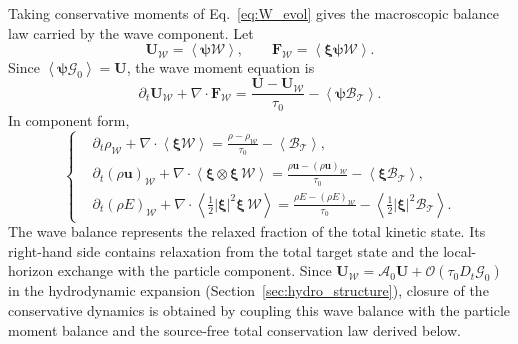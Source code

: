 \documentclass[preprint,12pt]{elsarticle}
\begin{document}
Taking conservative moments of Eq.~\eqref{eq:W_evol} gives the macroscopic balance law carried by the wave component. Let
\begin{equation}
    \mathbf U_{\mathcal{W}}=\left\langle \boldsymbol{\psi}\mathcal{W} \right\rangle,
    \qquad
    \mathbf F_{\mathcal{W}}=\left\langle \boldsymbol{\xi}\boldsymbol{\psi}\mathcal{W} \right\rangle.
\end{equation}
Since $\left\langle \boldsymbol{\psi}\mathcal{G}_0 \right\rangle=\mathbf U$, the wave moment equation is
\begin{equation}\label{eq:W_moment_equation}
    \partial_t\mathbf U_{\mathcal{W}}+\nabla\cdot\mathbf F_{\mathcal{W}}
    =
    \frac{\mathbf U-\mathbf U_{\mathcal{W}}}{\tau_0}
    -\left\langle \boldsymbol{\psi}\mathcal B_\mathcal{T} \right\rangle.
\end{equation}
In component form,
\begin{equation}\label{eq:W_moment_component}
\left\{
\begin{aligned}
&\partial_t\rho_{\mathcal{W}}+\nabla\cdot\left\langle \boldsymbol{\xi}\mathcal{W} \right\rangle
    =
    \frac{\rho-\rho_{\mathcal{W}}}{\tau_0}
    -\left\langle \mathcal B_\mathcal{T} \right\rangle,\\
&\partial_t(\rho\boldsymbol{u})_{\mathcal{W}}+\nabla\cdot\left\langle \boldsymbol{\xi}\otimes\boldsymbol{\xi}\,\mathcal{W} \right\rangle
    =
    \frac{\rho\boldsymbol{u}-(\rho\boldsymbol{u})_{\mathcal{W}}}{\tau_0}
    -\left\langle \boldsymbol{\xi}\mathcal B_\mathcal{T} \right\rangle,\\
&\partial_t(\rho E)_{\mathcal{W}}
    +\nabla\cdot\left\langle \frac{1}{2}|\boldsymbol{\xi}|^2\boldsymbol{\xi}\,\mathcal{W} \right\rangle
    =
    \frac{\rho E-(\rho E)_{\mathcal{W}}}{\tau_0}
    -\left\langle \frac{1}{2}|\boldsymbol{\xi}|^2\mathcal B_\mathcal{T} \right\rangle.
\end{aligned}
\right.
\end{equation}
The wave balance represents the relaxed fraction of the total kinetic state. Its right-hand side contains relaxation from the total target state and the local-horizon exchange with the particle component. Since $\mathbf U_{\mathcal{W}}=\mathcal A_0\mathbf U+\mathcal O(\tau_0D_t\mathcal{G}_0)$ in the hydrodynamic expansion (Section~\ref{sec:hydro_structure}), closure of the conservative dynamics is obtained by coupling this wave balance with the particle moment balance and the source-free total conservation law derived below.

\end{document}
